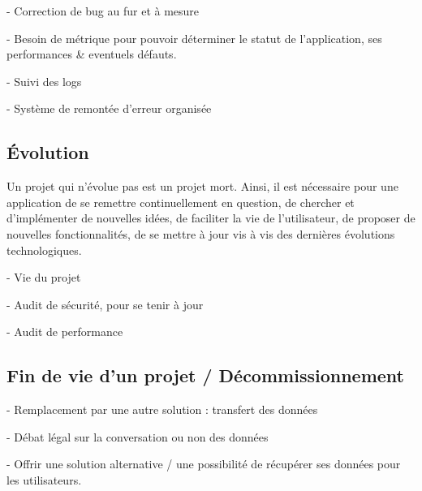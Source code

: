 - Correction de bug au fur et à mesure

- Besoin de métrique pour pouvoir déterminer le statut de l'application, ses performances \& eventuels défauts.

- Suivi des logs 

- Système de remontée d'erreur organisée


\subsection{Évolution}

Un projet qui n'évolue pas est un projet mort. Ainsi, il est nécessaire pour une application de se remettre continuellement en question, de chercher et d'implémenter de nouvelles idées, de faciliter la vie de l'utilisateur, de proposer de nouvelles fonctionnalités, de se mettre à jour vis à vis des dernières évolutions technologiques.


- Vie du projet

- Audit de sécurité, pour se tenir à jour

- Audit de performance

\subsection{Fin de vie d'un projet / Décommissionnement}


- Remplacement par une autre solution : transfert des données

- Débat légal sur la conversation ou non des données

- Offrir une solution alternative / une possibilité de récupérer ses données pour les utilisateurs.

